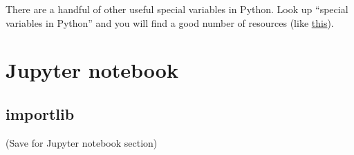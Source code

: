\documentclass[12pt,letterpaper]{article}
\begin{document}
There are a handful of other useful special variables in Python. Look up ``special variables in Python'' and you will find a good number of resources (like \href{https://gamedevacademy.org/python-special-variable-name-tutorial-complete-guide/}{this}).

\section{Jupyter notebook}

\subsection{importlib}

(Save for Jupyter notebook section)
\end{document}
